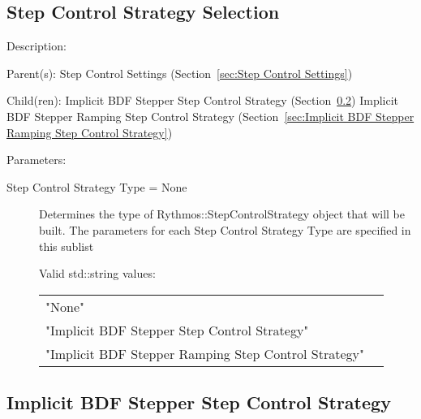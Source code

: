 \subsection{Step Control Strategy Selection}
\label{sec:Step Control Strategy Selection}

\begin{list}{}
  {\setlength{\leftmargin}{1.0in}
   \setlength{\labelwidth}{0.75in}
   \setlength{\labelsep}{0.125in}}
  \item[Description:]
  \item[Parent(s):]
    Step Control Settings (Section~\ref{sec:Step Control Settings})
  \item[Child(ren):]
    Implicit BDF Stepper Step Control Strategy (Section~\ref{sec:Implicit BDF Stepper Step Control Strategy})
      \newline 
    Implicit BDF Stepper Ramping Step Control Strategy (Section~\ref{sec:Implicit BDF Stepper Ramping Step Control Strategy})
  \item[Parameters:]
    \begin{description}
      \item[Step Control Strategy Type = None] 
Determines the type of Rythmos::StepControlStrategy object that will be built.
The parameters for each Step Control Strategy Type are specified in this sublist

  Valid std::string values:

      \begin{tabular}{lp{}}
      "None" & \\ 
      "Implicit BDF Stepper Step Control Strategy" & \\ 
      "Implicit BDF Stepper Ramping Step Control Strategy" & \\ 
      \end{tabular}
\end{description}

\end{list}

\subsection{Implicit BDF Stepper Step Control Strategy}
\label{sec:Implicit BDF Stepper Step Control Strategy}

